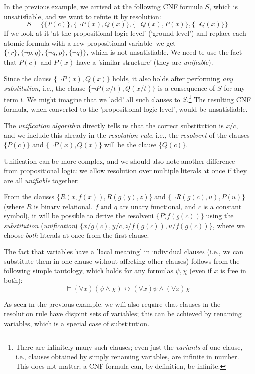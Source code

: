 \begin{example}
    In the previous example, we arrived at the following CNF formula $S$, which is unsatisfiable, and we want to refute it by resolution:    
    $$
    S = \{\{P(c)\},\{\neg P(x),Q(x)\},\{\neg Q(x),P(x)\},\{\neg Q(x)\}\}
    $$
    If we look at it 'at the propositional logic level' (`ground level') and replace each atomic formula with a new propositional variable, we get $\{\{r\},\{\neg p,q\},\{\neg q,p\},\{\neg q\}\}$, which is not unsatisfiable. We need to use the fact that $P(c)$ and $P(x)$ have a 'similar structure' (they are \emph{unifiable}).

    Since the clause $\{\neg P(x),Q(x)\}$ holds, it also holds after performing \emph{any substitution}, i.e., the clause $\{\neg P(x/t),Q(x/t)\}$ is a consequence of $S$ for any term $t$. We might imagine that we 'add' all such clauses to $S$.\footnote{There are infinitely many such clauses; even just the \emph{variants} of one clause, i.e., clauses obtained by simply renaming variables, are infinite in number. This does not matter; a CNF formula can, by definition, be infinite.} The resulting CNF formula, when converted to the 'propositional logic level', would be unsatisfiable.

    The \emph{unification algorithm} directly tells us that the correct substitution is $x/c$, and we include this already in the \emph{resolution rule}, i.e., the \emph{resolvent} of the clauses $\{P(c)\}$ and $\{\neg P(x),Q(x)\}$ will be the clause $\{Q(c)\}$.
\end{example}

Unification can be more complex, and we should also note another difference from propositional logic: we allow resolution over multiple literals at once if they are all \emph{unifiable} together:

\begin{example}
    From the clauses $\{R(x,f(x)),R(g(y),z)\}$ and $\{\neg R(g(c),u),P(u)\}$ (where $R$ is binary relational, $f$ and $g$ are unary functional, and $c$ is a constant symbol), it will be possible to derive the resolvent $\{P(f(g(c))\}$ using the \emph{substitution} (\emph{unification}) $\{x/g(c),y/c,z/f(g(c)),u/f(g(c))\}$, where we choose \emph{both} literals at once from the first clause.
\end{example}

\begin{remark}
    The fact that variables have a 'local meaning' in individual clauses (i.e., we can substitute them in one clause without affecting other clauses) follows from the following simple tautology, which holds for any formulas $\psi,\chi$ (even if $x$ is free in both):
    $$
    \models(\forall x)(\psi \land \chi) \leftrightarrow (\forall x)\psi \land (\forall x)\chi
    $$
    
    As seen in the previous example, we will also require that clauses in the resolution rule have disjoint sets of variables; this can be achieved by renaming variables, which is a special case of substitution.
\end{remark}

